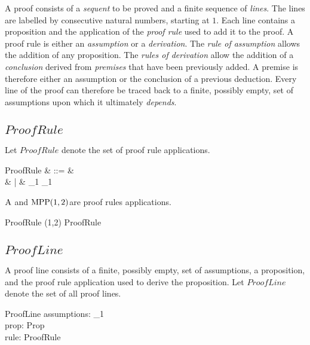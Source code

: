 \documentclass[11pt, oneside]{article}
\begin{document}
A proof consists of a {\it sequent} to be proved and a finite sequence of {\it lines}.
The lines are labelled by consecutive natural numbers, starting at $1$.
Each line contains a proposition and the application of the {\it proof rule} used to add it to the proof. 
A proof rule is either an {\it assumption} or a {\it derivation}.
The {\it rule of assumption} allows the addition of any proposition.
The {\it rules of derivation} allow the addition of a {\it conclusion} derived from {\it premises} that have been
previously added.
A premise is therefore either an assumption or the conclusion of a previous deduction.
Every line of the proof can therefore be traced back to a finite, possibly empty, set of assumptions upon
which it ultimately {\it depends}.

\subsection{$ProofRule$}

Let $ProofRule$ denote the set of proof rule applications.

\begin{syntax}
	ProofRule	& ::= &  \\
			&  |	&  \ldata \nat_1 \cross \nat_1 \rdata
\end{syntax}

\begin{example}
$\operatorname{A}$ and $\operatorname{MPP}(1,2)$are proof rules applications.

\begin{zed}
	 \in ProofRule
\also
	(1,2) \in ProofRule
\end{zed}

\end{example}

\subsection{$ProofLine$}

A proof line consists of a finite, possibly empty, set of assumptions, a proposition,
and the proof rule application used to derive the proposition.
Let $ProofLine$ denote the set of all proof lines.

\begin{schema}{ProofLine}
	assumptions: \finset \nat_1 \\
	prop: Prop \\
	rule: ProofRule
\end{schema}
\end{document}
